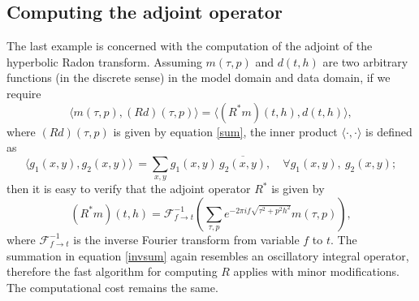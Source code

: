 






\subsection{Computing the adjoint operator}

The last example is concerned with the computation of the adjoint of the hyperbolic Radon transform. Assuming $m(\tau,p)$ and $d(t,h)$ are two arbitrary functions (in the discrete sense) in the model domain and data domain, if we require 
\begin{equation}
\langle m(\tau,p),(Rd)(\tau,p)\rangle =\langle(R^*m)(t,h),d(t,h)\rangle,
\end{equation}
where $(Rd)(\tau,p)$ is given by equation \ref{sum}, the inner product $\langle\cdot,\cdot\rangle$ is defined as
\begin{equation}
\langle g_1(x,y),g_2(x,y)\rangle\,=\sum_{x,y} g_1(x,y)\,\overline{g_2
(x,y)}, \quad \forall g_1(x,y), \ g_2(x,y);
\end{equation}
then it is easy to verify that the adjoint operator $R^*$ is given by
\begin{equation} \label{invsum}
(R^*m)(t,h)=\mathcal{F}_{f\rightarrow t}^{-1}\left(\sum_{\tau,p}e^{-2\pi i f \sqrt{\tau^2+p^2h^2}}m(\tau,p)\right),
\end{equation}
where $\mathcal{F}^{-1}_{f\rightarrow t}$ is the inverse Fourier transform from variable $f$ to $t$. The summation in equation \ref{invsum} again resembles an oscillatory integral operator, therefore the fast algorithm for computing $R$ applies with minor modifications. The computational cost remains the same.

